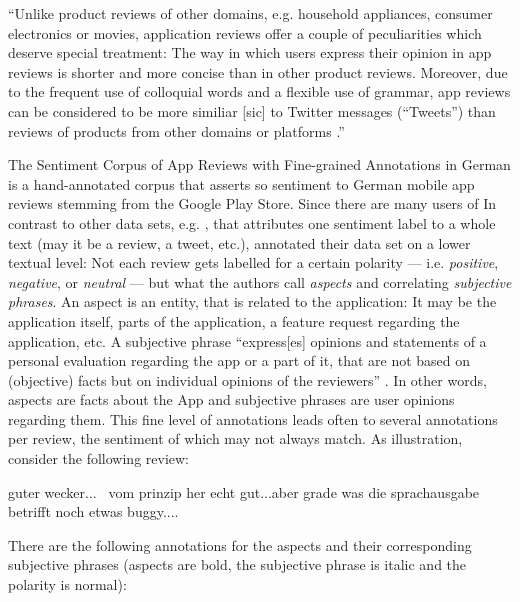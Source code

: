 ``Unlike product reviews of other domains, e.g. household appliances, consumer electronics or
movies, application reviews offer a couple of peculiarities which deserve special treatment:
The way in which users express their opinion in app reviews is shorter and more concise than in
other product reviews.
Moreover, due to the frequent use of colloquial words and a flexible use of grammar, app reviews
can be considered to be more similiar [sic] to Twitter messages (“Tweets”) than reviews of
products from other domains or platforms \textelp{}.'' \citep[p.~1114]{sanger2016scare}


The Sentiment Corpus of App Reviews with Fine-grained Annotations in German \cite{sanger2016scare}
is a hand-annotated corpus that asserts so sentiment to German mobile app reviews stemming from
the Google Play Store.
Since there are many users of
In contrast to other data sets, e.g. \citep{socher2013recursive, go2009twitter}, that attributes
one sentiment label to a whole text (may it be a review, a tweet, etc.), \cite{sanger2016scare}
annotated their data set on a lower textual level:
Not each review gets labelled for a certain polarity --- i.e. \emph{positive}, \emph{negative}, or
\emph{neutral} --- but what the authors call \emph{aspects} and correlating \emph{subjective
phrases}.
An aspect is an entity, that is related to the application:
It may be the application itself, parts of the application, a feature request regarding the
application, etc.
A subjective phrase ``express[es] opinions and statements of a personal evaluation regarding the
app or a part of it, that are not based on (objective) facts but on individual opinions of the
reviewers'' \citep[p.~1116]{sanger2016scare}.
In other words, aspects are facts about the App and subjective phrases are user opinions regarding
them.
This fine level of annotations leads often to several annotations per review, the sentiment of
which may not always match.
As illustration, consider the following review:

\begin{examples}
  \label{ex:fine-grained-anno}
  \item guter wecker... \textbar\textbar\ vom prinzip her echt gut...aber grade was die sprachausgabe betrifft noch etwas buggy....
\end{examples}

There are the following annotations for the aspects and their corresponding subjective phrases
(aspects are bold, the subjective phrase is italic and the polarity is normal):


